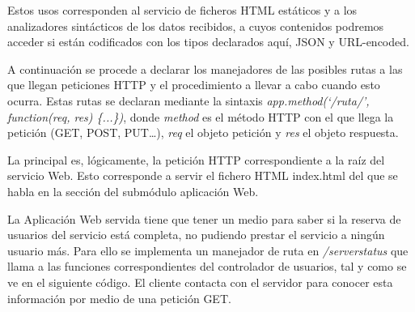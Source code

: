 
Estos usos corresponden al servicio de ficheros HTML estáticos y a los analizadores sintácticos de los datos recibidos, a cuyos contenidos podremos acceder si están codificados con los tipos declarados aquí, JSON y URL-encoded.

A continuación se procede a declarar los manejadores de las posibles rutas a las que llegan peticiones HTTP y el procedimiento a llevar a cabo cuando esto ocurra. Estas rutas se declaran mediante la sintaxis \emph{app.method(`/ruta/', function(req, res) \{...\})}, donde \emph{method} es el método HTTP con el que llega la petición (GET, POST, PUT…), \emph{req} el objeto petición y \emph{res} el objeto respuesta.


La principal es, lógicamente, la petición HTTP correspondiente a la raíz del servicio Web. Esto corresponde a servir el fichero HTML index.html del que se habla en la sección del submódulo aplicación Web.

La Aplicación Web servida tiene que tener un medio para saber si la reserva de usuarios del servicio está completa, no pudiendo prestar el servicio a ningún usuario más. Para ello se implementa un manejador de ruta en \emph{/serverstatus} que llama a las funciones correspondientes del controlador de usuarios, tal y como se ve en el siguiente código. El cliente contacta con el servidor para conocer esta información por medio de una petición GET.

